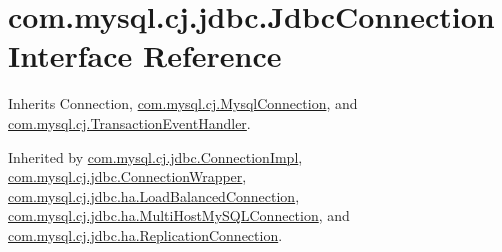\hypertarget{interfacecom_1_1mysql_1_1cj_1_1jdbc_1_1_jdbc_connection}{}\section{com.\+mysql.\+cj.\+jdbc.\+Jdbc\+Connection Interface Reference}
\label{interfacecom_1_1mysql_1_1cj_1_1jdbc_1_1_jdbc_connection}


Inherits Connection, \mbox{\hyperlink{interfacecom_1_1mysql_1_1cj_1_1_mysql_connection}{com.\+mysql.\+cj.\+Mysql\+Connection}}, and \mbox{\hyperlink{interfacecom_1_1mysql_1_1cj_1_1_transaction_event_handler}{com.\+mysql.\+cj.\+Transaction\+Event\+Handler}}.



Inherited by \mbox{\hyperlink{classcom_1_1mysql_1_1cj_1_1jdbc_1_1_connection_impl}{com.\+mysql.\+cj.\+jdbc.\+Connection\+Impl}}, \mbox{\hyperlink{classcom_1_1mysql_1_1cj_1_1jdbc_1_1_connection_wrapper}{com.\+mysql.\+cj.\+jdbc.\+Connection\+Wrapper}}, \mbox{\hyperlink{interfacecom_1_1mysql_1_1cj_1_1jdbc_1_1ha_1_1_load_balanced_connection}{com.\+mysql.\+cj.\+jdbc.\+ha.\+Load\+Balanced\+Connection}}, \mbox{\hyperlink{classcom_1_1mysql_1_1cj_1_1jdbc_1_1ha_1_1_multi_host_my_s_q_l_connection}{com.\+mysql.\+cj.\+jdbc.\+ha.\+Multi\+Host\+My\+S\+Q\+L\+Connection}}, and \mbox{\hyperlink{interfacecom_1_1mysql_1_1cj_1_1jdbc_1_1ha_1_1_replication_connection}{com.\+mysql.\+cj.\+jdbc.\+ha.\+Replication\+Connection}}.

